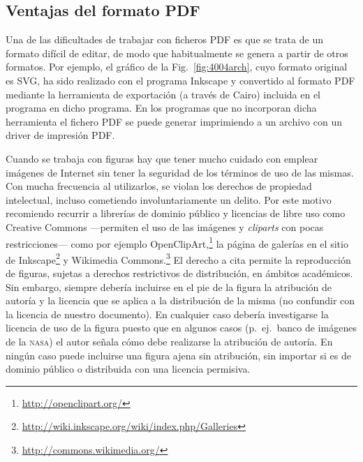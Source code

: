 \documentclass[11pt,a4paper]{article}
\begin{document}
\subsection{Ventajas del formato \textsf{PDF}}
Una de las dificultades de trabajar con ficheros \textsf{PDF} es que se trata de un formato difícil de editar, de modo que habitualmente se genera a partir de otros formatos. Por ejemplo, el gráfico de la Fig.~\ref{fig:4004arch}, cuyo formato original es \textsf{SVG}, ha sido realizado con el programa \textsf{Inkscape} y convertido al formato \textsf{PDF} mediante la herramienta de exportación (a través de \textsf{Cairo}) incluida en el programa en dicho programa. En los programas que no incorporan dicha herramienta el fichero \textsf{PDF} se puede generar imprimiendo a un archivo con un driver de impresión \textsf{PDF}. 

Cuando se trabaja con figuras hay que tener mucho cuidado con emplear imágenes de Internet sin tener la seguridad de los términos de uso de las mismas. Con mucha frecuencia al utilizarlos, se violan los derechos de propiedad intelectual, incluso cometiendo involuntariamente un delito. Por este motivo recomiendo recurrir a librerías de dominio público y licencias de libre uso como Creative Commons ---permiten el uso de las imágenes y \emph{cliparts} con pocas restricciones--- como por ejemplo OpenClipArt,\footnote{\url{http://openclipart.org/}} la página de galerías en el sitio de Inkscape\footnote{\url{http://wiki.inkscape.org/wiki/index.php/Galleries}} y Wikimedia Commons.\footnote{\url{http://commons.wikimedia.org/}} El derecho a cita permite la reproducción de figuras, sujetas a derechos restrictivos de distribución, en ámbitos académicos. Sin embargo, siempre debería incluirse en el pie de la figura la atribución de autoría y la licencia que se aplica a la distribución de la misma (no confundir con la licencia de nuestro documento). En cualquier caso debería investigarse la licencia de uso de la figura puesto que en algunos casos (p.~ej.\ banco de imágenes de la \textsc{nasa}) el autor señala cómo debe realizarse la atribución de autoría. En ningún caso puede incluirse una figura ajena sin atribución, sin importar si es de dominio público o distribuida con una licencia permisiva.
\end{document}
